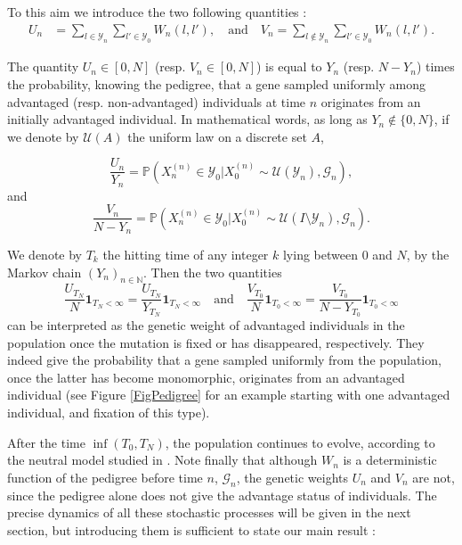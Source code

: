 \documentclass[11pt]{article}
\theoremstyle{remark}
\numberwithin{equation}{section}
\begin{document}
To this aim we introduce the two following quantities : 
\begin{align*}
U_n&=\sum_{l\in\mathcal{Y}_n}\sum_{l'\in\mathcal{Y}_0} W_n(l,l'), \quad\text{and}\quad
V_n=\sum_{l\notin\mathcal{Y}_n}\sum_{l'\in\mathcal{Y}_0} W_n(l,l').
\end{align*}

The quantity $U_n\in[0,N]$ (resp. $V_n\in[0,N]$) is equal to $Y_n$ (resp. $N-Y_n$) times the probability, knowing the pedigree, that a gene sampled uniformly among advantaged (resp. non-advantaged) individuals at time $n$ originates from an initially advantaged individual. In mathematical words, as long as $Y_n\notin\{0,N\}$, if we denote by $\mathcal{U}(A)$ the uniform law on a discrete set $A$,

$$\frac{U_n}{Y_n}=\mathbb{P}(X_n^{(n)}\in \mathcal{Y}_0| X^{(n)}_0\sim\mathcal{U}(\mathcal{Y}_n),\mathcal{G}_n),$$ and $$\frac{V_n}{N-Y_n}=\mathbb{P}(X_n^{(n)}\in\mathcal{Y}_0| X^{(n)}_0\sim\mathcal{U}(I\setminus\mathcal{Y}_n),\mathcal{G}_n).$$

We denote by $T_k$ the hitting time of any integer $k$ lying between $0$ and $N$, by the Markov chain $(Y_n)_{n\in\mathbb{N}}$. Then the two quantities $$\frac{U_{T_N}}{N}\mathbf{1}_{T_N<\infty}=\frac{U_{T_N}}{Y_{T_N}}\mathbf{1}_{T_N<\infty}\quad\text{and}\quad\frac{V_{T_0}}{N}\mathbf{1}_{T_0<\infty}=\frac{V_{T_0}}{N-Y_{T_0}}\mathbf{1}_{T_0<\infty}$$
 can be interpreted as the genetic weight of advantaged individuals in the population once the mutation is fixed or has disappeared, respectively. They indeed give the probability that a gene sampled uniformly from the population, once the latter has become monomorphic, originates from an advantaged individual (see Figure \ref{FigPedigree} for an example starting with one advantaged individual, and fixation of this type). 
 
After the time $\inf(T_0,T_N)$, the population continues to evolve, according to the neutral model studied in \cite{geneal}. Note finally that although $W_n$ is a deterministic function of the pedigree before time $n$, $\mathcal{G}_n$, the genetic weights $U_n$ and $V_n$ are not, since the pedigree alone does not give the advantage status of individuals. The precise dynamics of all these stochastic processes will be given in the next section, but introducing them is sufficient to state our main result :
\end{document}
